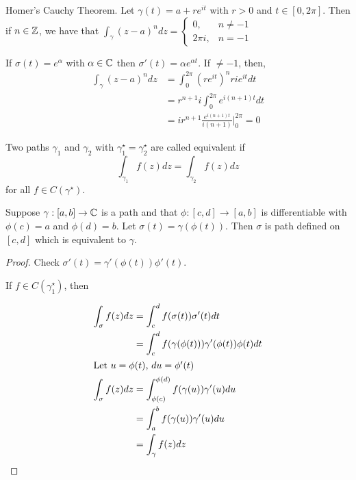 \documentclass[12pt]{article}
\begin{document}
\begin{theorem}{Homer's Cauchy Theorem.}
    Let $\gamma(t) =a + re^{it}$ with $r > 0$ and $t \in [0,2\pi]$. Then if $n \in \mathbb Z$, we have that $\int_\gamma(z-a)^n dz = \begin{cases}
        0, & n\neq -1 \\
        2\pi i, & n = -1
    \end{cases}$

    If $\sigma(t) = e^{\alpha}$ with $\alpha \in \mathbb C$ then $\sigma'(t) =\alpha e^{\alpha t}$. If $\neq -1$, then, 
    \begin{align*}
        \int_\gamma(z-a)^n dz &= \int_0^{2\pi}(re^{it})^n rie ^{it} dt \\
        &= r^{n+1} i \int_0^{2\pi}e^{i(n+1)t} dt\\ 
        &= ir^{n+1} \frac{e^{i(n+1)t}}{i(n+1)} \big \vert_0^{2\pi} = 0
    \end{align*}
\end{theorem}

\begin{definition}
    Two paths $\gamma_1$ and $\gamma_2$ with $\gamma_1^\star = \gamma_2^\star$ are called equivalent if 
    \[\int_{\gamma_1} f(z) dz = \int_{\gamma_2}f(z) dz\] 
    for all $f \in C(\gamma^\star)$. 
\end{definition}

\begin{lemma}[{3.20}]
    Suppose $\gamma: [a,b] \to \mathbb C$ is a path and that $\phi: [c,d] \to [a,b]$ is differentiable with $\phi(c) = a$ and $\phi(d) = b$. Let $\sigma(t) = \gamma(\phi(t))$. Then $\sigma$ is path defined on $[c,d]$ which is equivalent to $\gamma$. 
\end{lemma}
\begin{proof}
    Check $\sigma'(t) = \gamma'(\phi(t))\phi'(t)$. 

    If $f \in C(\gamma_1^\star)$, then 

    \begin{align*}
        \int_\sigma f(z) dz &= \int_c^d f(\sigma(t)) \sigma'(t) dt \\ 
        &= \int_c^d f(\gamma(\phi(t))) \gamma'(\phi(t))\phi(t) dt \\ 
        \intertext{Let $u = \phi(t)$, $du = \phi'(t)$}
        \int_\sigma f(z) dz &= \int_{\phi(c)}^{\phi(d)} f(\gamma(u))\gamma'(u) du \\
        &= \int_a^b f(\gamma(u)) \gamma'(u) du \\
        &= \int_\gamma f(z) dz
    \end{align*}
\end{proof}
\end{document}
